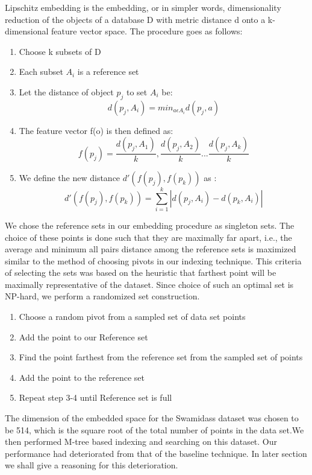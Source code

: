 Lipschitz embedding is the embedding, or in simpler words, dimensionality reduction of the objects of
a database D with metric distance d onto a k-dimensional feature vector space. The procedure goes as follows:
\begin{enumerate}
	\item Choose k subsets of D
	\item Each subset $A_i$ is a reference set
	\item Let the distance of object $p_j$ to set $A_i$ be:
	\[ d(p_j,A_i)= min_{a\epsilon A_{i}}      d(p_j,a) \]
	\item The feature vector f(o) is then defined as:
	\[f(p_j)= {\frac{d(p_j,A_1)}{k},\frac{d(p_j,A_2)}{k}...\frac{d(p_j,A_k)}{k}} \]
	\item We define the new distance $d'(f(p_j),f(p_k))$ as :
	\[d'(f(p_j),f(p_k)) = \sum \limits_{i=1}^{k} | d(p_j,A_i)-d(p_k,A_i)|\] 
\end{enumerate}

	We chose the reference sets in our embedding procedure as singleton sets. The choice of these points is done such that they are maximally far apart, i.e., the average and minimum all pairs distance among the reference sets is maximized similar to the method of choosing pivots in our indexing technique. This criteria of selecting the sets was based on the heuristic that farthest point will be maximally representative of the dataset. Since choice of such an optimal set is NP-hard, we perform a randomized set construction.\\

\begin{enumerate}
	\item Choose a random pivot from a sampled set of  data set points

	\item Add the point to our Reference set

	\item Find the point farthest from the reference set from the sampled set of points

	\item Add the point to the reference set

	\item Repeat step 3-4 until Reference set is full\\
\end{enumerate}

The dimension of the embedded space for the Swamidass dataset was chosen to be 514, which is the square root of the total number of points in the data set.We then performed M-tree based indexing and searching on this dataset. Our performance had deteriorated from that of the baseline technique. In later section we shall give a reasoning for this deterioration.